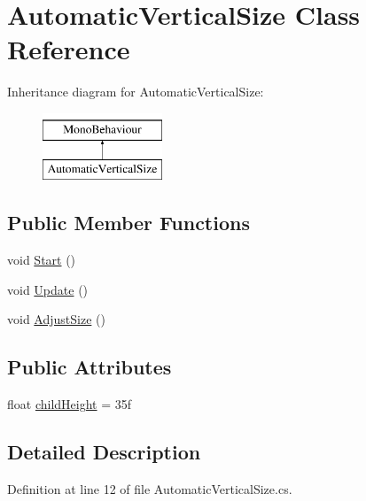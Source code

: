 \hypertarget{class_automatic_vertical_size}{}\section{Automatic\+Vertical\+Size Class Reference}
\label{class_automatic_vertical_size}
Inheritance diagram for Automatic\+Vertical\+Size\+:\begin{figure}[H]
\begin{center}
\leavevmode
\includegraphics[height=2.000000cm]{class_automatic_vertical_size}
\end{center}
\end{figure}
\subsection*{Public Member Functions}
\begin{DoxyCompactItemize}
\item 
void \hyperlink{class_automatic_vertical_size_a4f195ccac99473238e7d49dece8de7fa}{Start} ()
\item 
void \hyperlink{class_automatic_vertical_size_a2e08b94693c7043ac19320b669de4c7d}{Update} ()
\item 
void \hyperlink{class_automatic_vertical_size_a2f74f8b213c2ecdaae4a05487691bbe0}{Adjust\+Size} ()
\end{DoxyCompactItemize}
\subsection*{Public Attributes}
\begin{DoxyCompactItemize}
\item 
float \hyperlink{class_automatic_vertical_size_a168ddf84313ccbc06cea6f692ab96f76}{child\+Height} = 35f
\end{DoxyCompactItemize}


\subsection{Detailed Description}


Definition at line 12 of file Automatic\+Vertical\+Size.\+cs.



